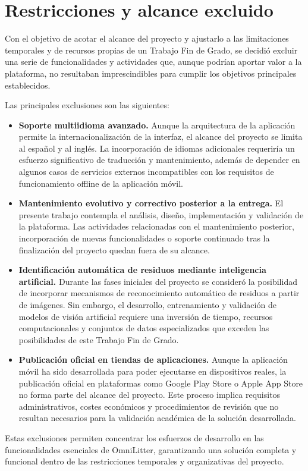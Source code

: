 \section{Restricciones y alcance excluido}

Con el objetivo de acotar el alcance del proyecto y ajustarlo a las limitaciones temporales y de recursos propias de un Trabajo Fin de Grado, se decidió excluir una serie de funcionalidades y actividades que, aunque podrían aportar valor a la plataforma, no resultaban imprescindibles para cumplir los objetivos principales establecidos.

Las principales exclusiones son las siguientes:

\begin{itemize}

    \item \textbf{Soporte multiidioma avanzado.} Aunque la arquitectura de la aplicación permite la internacionalización de la interfaz, el alcance del proyecto se limita al español y al inglés. La incorporación de idiomas adicionales requeriría un esfuerzo significativo de traducción y mantenimiento, además de depender en algunos casos de servicios externos incompatibles con los requisitos de funcionamiento offline de la aplicación móvil.

    \item \textbf{Mantenimiento evolutivo y correctivo posterior a la entrega.} El presente trabajo contempla el análisis, diseño, implementación y validación de la plataforma. Las actividades relacionadas con el mantenimiento posterior, incorporación de nuevas funcionalidades o soporte continuado tras la finalización del proyecto quedan fuera de su alcance.

    \item \textbf{Identificación automática de residuos mediante inteligencia artificial.} Durante las fases iniciales del proyecto se consideró la posibilidad de incorporar mecanismos de reconocimiento automático de residuos a partir de imágenes. Sin embargo, el desarrollo, entrenamiento y validación de modelos de visión artificial requiere una inversión de tiempo, recursos computacionales y conjuntos de datos especializados que exceden las posibilidades de este Trabajo Fin de Grado.

    \item \textbf{Publicación oficial en tiendas de aplicaciones.} Aunque la aplicación móvil ha sido desarrollada para poder ejecutarse en dispositivos reales, la publicación oficial en plataformas como Google Play Store o Apple App Store no forma parte del alcance del proyecto. Este proceso implica requisitos administrativos, costes económicos y procedimientos de revisión que no resultan necesarios para la validación académica de la solución desarrollada.

\end{itemize}

Estas exclusiones permiten concentrar los esfuerzos de desarrollo en las funcionalidades esenciales de OmniLitter, garantizando una solución completa y funcional dentro de las restricciones temporales y organizativas del proyecto.
